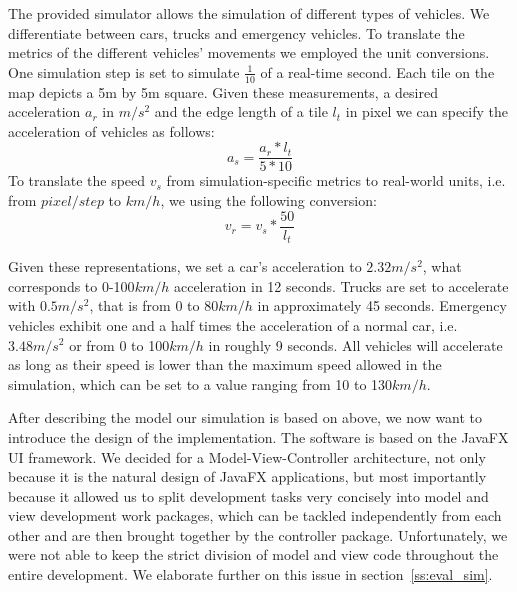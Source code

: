 The provided simulator allows the simulation of different types of vehicles. We differentiate between cars, trucks and emergency vehicles. To translate the metrics of the different vehicles' movements we employed the unit conversions. One simulation step is set to simulate $\frac{1}{10}$ of a real-time second. Each tile on the map depicts a 5m by 5m square. Given these measurements, a desired acceleration $a_r$ in $m/s^2$ and the edge length of a tile $l_t$ in pixel we can specify the acceleration of vehicles as follows:
	\begin{equation}\label{for:acceleration}	
		a_s = \frac{a_r * l_t}{5 * 10}
	\end{equation}
	To translate the speed $v_s$ from simulation-specific metrics to real-world units, i.e. from $pixel/step$ to $km/h$, we using the following conversion:
	\begin{equation}\label{for:speed}
		v_r = v_s * \frac{50}{l_t} 
	\end{equation}
	
Given these representations, we set a car's acceleration to $2.32m/s^2$, what corresponds to 0-100$km/h$ acceleration in 12 seconds. Trucks are set to accelerate with $0.5m/s^2$, that is from 0 to 80$km/h$ in approximately 45 seconds. Emergency vehicles exhibit 	one and a half times the acceleration of a normal car, i.e. $3.48m/s^2$ or from 0 to 100$km/h$ in roughly 9 seconds. All vehicles will accelerate as long as their speed is lower than the maximum speed allowed in the simulation, which can be set to a value ranging from 10 to 130$km/h$.
	
After describing the model our simulation is based on above, we now want to introduce the design of the implementation. The software is based on the JavaFX UI framework. We decided for a Model-View-Controller architecture, not only because it is the natural design of JavaFX applications, but most importantly because it allowed us to split development tasks very concisely into model and view development work packages, which can be tackled independently from each other and are then brought together by the controller package. Unfortunately, we were not able to keep the strict division of model and view code throughout the entire development. We elaborate further on this issue in section~\ref{ss:eval_sim}. 

